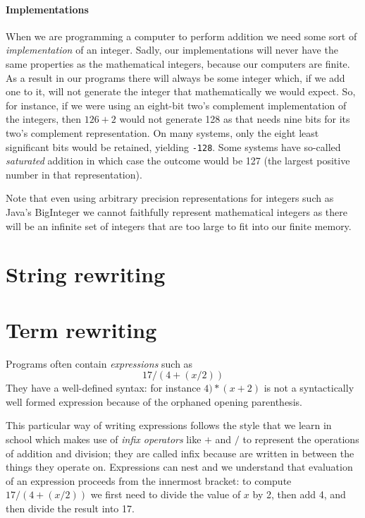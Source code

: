 \paragraph{Implementations} When we are programming a computer to perform addition we need some sort of {\em implementation} of an integer. Sadly, our implementations will never have the same properties as the mathematical integers, because our computers are finite. As a result in our programs there will always be some integer which, if we add one to it, will not generate the integer that mathematically we would expect. So, for instance, if we were using an eight-bit two's complement implementation of the integers, then $126 + 2$ would not generate 128 as that needs nine bits for its two's complement representation. On many systems, only the eight least significant bits would be retained, yielding {\tt -128}. Some systems have so-called {\em saturated} addition in which case the outcome would be 127 (the largest positive number in that representation). 

Note that even using arbitrary precision representations for integers such as Java's BigInteger we cannot faithfully represent mathematical integers as there will be an infinite set of integers that are too large to fit into our finite memory.

\section{String rewriting}

\section{Term rewriting}
\label{TermRewriting}
Programs often contain {\em expressions} such as \[17 / (4 + (x / 2)) \]They have a well-defined syntax: for instance $ 4 ) * (x + 2)$ is not a syntactically well formed expression because of the orphaned opening parenthesis. 

This particular way of writing expressions follows the style that we learn in school which makes use of {\em infix operators} like $+$ and $/$ to represent the operations of addition and division; they are called infix because are written in between the things they operate on. Expressions can nest and we understand that evaluation of an expression proceeds from the innermost bracket: to compute $17 / (4 + (x / 2))$ we first need to divide the value of $x$ by 2, then add 4, and then divide the result into 17.

